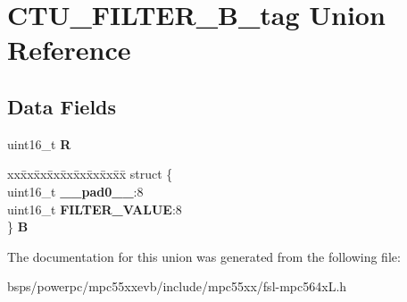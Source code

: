 \hypertarget{unionCTU__FILTER__16B__tag}{}\section{C\+T\+U\+\_\+\+F\+I\+L\+T\+E\+R\+\_\+B\+\_\+tag Union Reference}
\label{unionCTU__FILTER__16B__tag}
\subsection*{Data Fields}
\begin{DoxyCompactItemize}
\item 
\mbox{\label{unionCTU__FILTER__16B__tag_a8af3feb87d004d29083b9e857f9950c6}} 
uint16\+\_\+t {\bfseries R}
\item 
\mbox{\label{unionCTU__FILTER__16B__tag_af16e12083bcb135fd17083f8f9d73c14}} 
\begin{tabbing}
xx\=xx\=xx\=xx\=xx\=xx\=xx\=xx\=xx\=\kill
struct \{\\
\>uint16\_t {\bfseries \_\_pad0\_\_}:8\\
\>uint16\_t {\bfseries FILTER\_VALUE}:8\\
\} {\bfseries B}\\

\end{tabbing}\end{DoxyCompactItemize}


The documentation for this union was generated from the following file\+:\begin{DoxyCompactItemize}
\item 
bsps/powerpc/mpc55xxevb/include/mpc55xx/fsl-\/mpc564x\+L.\+h\end{DoxyCompactItemize}
